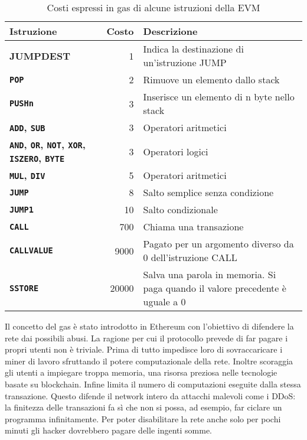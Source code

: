 \begin{table}[h]                        
\begin{center}  
\begin{tabular}{p{5cm}rp{6cm}}  

\hline \hline   %
Istruzione & Costo & Descrizione\\   %
\hline  %
\bf JUMPDEST & 1 & Indica la destinazione di un'istruzione JUMP\\
\bf \texttt{POP} & 2 & Rimuove un elemento dallo stack\\
\bf \texttt{PUSHn} & 3 & Inserisce un elemento di n byte nello stack\\
\bf \texttt{ADD}, \texttt{SUB} & 3 & Operatori aritmetici\\
\bf \texttt{AND}, \texttt{OR}, \texttt{NOT}, \texttt{XOR}, \texttt{ISZERO}, \texttt{BYTE} & 3 & Operatori logici\\
\bf \texttt{MUL}, \texttt{DIV} & 5 & Operatori aritmetici\\
\bf \texttt{JUMP} & 8 & Salto semplice senza condizione\\
\bf \texttt{JUMP1} & 10 & Salto condizionale\\
\hline
\bf \texttt{CALL} & 700 & Chiama una transazione\\
\bf \texttt{CALLVALUE} & 9000 & Pagato per un argomento diverso da 0 dell'istruzione CALL\\
\bf \texttt{SSTORE} & 20000 & Salva una parola in memoria. Si paga quando il valore precedente è uguale a 0\\
\hline \hline
\end{tabular}
\caption[Costi delle istruzioni della EVM]{Costi espressi in gas di alcune istruzioni della EVM}\label{tab:gas-costs}
\end{center}
\end{table}

\indent  Il concetto del gas è stato introdotto in Ethereum con 
l'obiettivo di difendere la rete dai possibili abusi. La ragione per cui il protocollo prevede di far pagare i propri utenti non è triviale. Prima di tutto impedisce loro di sovraccaricare i miner di lavoro sfruttando il potere computazionale della rete. Inoltre scoraggia gli utenti a impiegare troppa memoria, una risorsa preziosa nelle tecnologie basate su blockchain. Infine limita il numero di computazioni eseguite dalla stessa transazione. Questo difende il network intero da attacchi malevoli come i DDoS: la finitezza delle transazioni fa sì che non si possa, ad esempio, far ciclare un programma infinitamente. Per poter disabilitare la rete anche solo per pochi minuti gli hacker dovrebbero pagare delle ingenti somme.\newline


